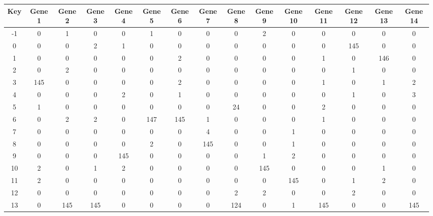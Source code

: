 \begin{tabular}{|c|c|c|c|c|c|c|c|c|c|c|c|c|c|c|}
\hline
Key & Gene 1 & Gene 2 & Gene 3 & Gene 4 & Gene 5 & Gene 6 & Gene 7 & Gene 8 & Gene 9 & Gene 10 & Gene 11 & Gene 12 & Gene 13 & Gene 14 \\
\hline
-1 & 0 & 1 & 0 & 0 & 1 & 0 & 0 & 0 & 2 & 0 & 0 & 0 & 0 & 0 \\
0 & 0 & 0 & 2 & 1 & 0 & 0 & 0 & 0 & 0 & 0 & 0 & 145 & 0 & 0 \\
1 & 0 & 0 & 0 & 0 & 0 & 2 & 0 & 0 & 0 & 0 & 1 & 0 & 146 & 0 \\
2 & 0 & 2 & 0 & 0 & 0 & 0 & 0 & 0 & 0 & 0 & 0 & 1 & 0 & 0 \\
3 & 145 & 0 & 0 & 0 & 0 & 2 & 0 & 0 & 0 & 0 & 1 & 0 & 1 & 2 \\
4 & 0 & 0 & 0 & 2 & 0 & 1 & 0 & 0 & 0 & 0 & 0 & 1 & 0 & 3 \\
5 & 1 & 0 & 0 & 0 & 0 & 0 & 0 & 24 & 0 & 0 & 2 & 0 & 0 & 0 \\
6 & 0 & 2 & 2 & 0 & 147 & 145 & 1 & 0 & 0 & 0 & 1 & 0 & 0 & 0 \\
7 & 0 & 0 & 0 & 0 & 0 & 0 & 4 & 0 & 0 & 1 & 0 & 0 & 0 & 0 \\
8 & 0 & 0 & 0 & 0 & 2 & 0 & 145 & 0 & 0 & 1 & 0 & 0 & 0 & 0 \\
9 & 0 & 0 & 0 & 145 & 0 & 0 & 0 & 0 & 1 & 2 & 0 & 0 & 0 & 0 \\
10 & 2 & 0 & 1 & 2 & 0 & 0 & 0 & 0 & 145 & 0 & 0 & 0 & 1 & 0 \\
11 & 2 & 0 & 0 & 0 & 0 & 0 & 0 & 0 & 0 & 145 & 0 & 1 & 2 & 0 \\
12 & 0 & 0 & 0 & 0 & 0 & 0 & 0 & 2 & 2 & 0 & 0 & 2 & 0 & 0 \\
13 & 0 & 145 & 145 & 0 & 0 & 0 & 0 & 124 & 0 & 1 & 145 & 0 & 0 & 145 \\
\hline
\end{tabular}